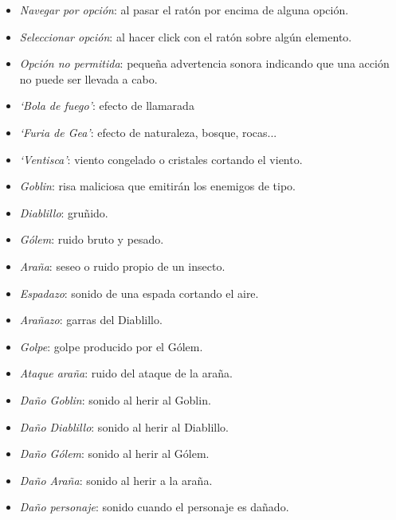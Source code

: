 \begin{itemize}
    \item \emph{Navegar por opción}: al pasar el ratón por encima de alguna
    opción.
    \item \emph{Seleccionar opción}: al hacer click con el ratón sobre algún
    elemento.
    \item \emph{Opción no permitida}: pequeña advertencia sonora indicando que
    una acción no puede ser llevada a cabo.
    \item \emph{`Bola de fuego'}: efecto de llamarada
    \item \emph{`Furia de Gea'}: efecto de naturaleza, bosque, rocas...
    \item \emph{`Ventisca'}: viento congelado o cristales cortando el viento.
    \item \emph{Goblin}: risa maliciosa que emitirán los enemigos de tipo.
    \item \emph{Diablillo}: gruñido.
    \item \emph{Gólem}: ruido bruto y pesado.
    \item \emph{Araña}: seseo o ruido propio de un insecto.
    \item \emph{Espadazo}: sonido de una espada cortando el aire.
    \item \emph{Arañazo}: garras del Diablillo.
    \item \emph{Golpe}: golpe producido por el Gólem.
    \item \emph{Ataque araña}: ruido del ataque de la araña.
    \item \emph{Daño Goblin}: sonido al herir al Goblin.
    \item \emph{Daño Diablillo}: sonido al herir al Diablillo.
    \item \emph{Daño Gólem}: sonido al herir al Gólem.
    \item \emph{Daño Araña}: sonido al herir a la araña.
    \item \emph{Daño personaje}: sonido cuando el personaje es dañado.
\end{itemize}
